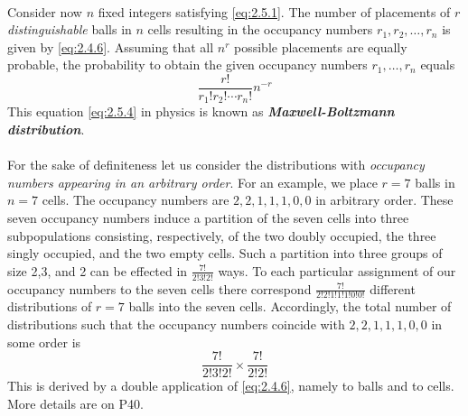 \documentclass{article}
\numberwithin{equation}{subsection}
\begin{document}
			\paragraph{} Consider now $n$ fixed integers satisfying \eqref{eq:2.5.1}. The number of placements of $r$ \textit{distinguishable} balls in $n$ cells resulting in the occupancy numbers $r_1, r_2, \dots, r_n$ is given by \eqref{eq:2.4.6}. Assuming that all $n^r$ possible placements are equally probable, the probability to obtain the given occupancy numbers $r_1,\dots,r_n$ equals
			\begin{equation}
				\label{eq:2.5.4}
				\frac{r!}{r_1!r_2!\cdots r_n!}n^{-r}
			\end{equation}
			This equation \eqref{eq:2.5.4} in physics is known as \textit{\textbf{Maxwell-Boltzmann distribution}}.
			\paragraph{} For the sake of definiteness let us consider the distributions with \textit{occupancy numbers appearing in an arbitrary order}. For an example, we place $r=7$ balls in $n=7$ cells. The occupancy numbers are $2,2,1,1,1,0,0$ in arbitrary order. These seven occupancy numbers induce a partition of the seven cells into three subpopulations consisting, respectively, of the two doubly occupied, the three singly occupied, and the two empty cells. Such a partition into three groups of size 2,3, and 2 can be effected in $\frac{7!}{2!3!2!}$ ways. To each particular assignment of our occupancy numbers to the seven cells there correspond $\frac{7!}{2!2!1!1!1!0!0!}$ different distributions of $r=7$ balls into the seven cells. Accordingly, the total number of distributions such that the occupancy numbers coincide with $2,2,1,1,1,0,0$ in some order is \begin{equation}
				\label{eq:2.5.5}
				\frac{7!}{2!3!2!}\times\frac{7!}{2!2!}
			\end{equation} This is derived by a double application of \eqref{eq:2.4.6}, namely to balls and to cells. More details are on P40.
\end{document}
